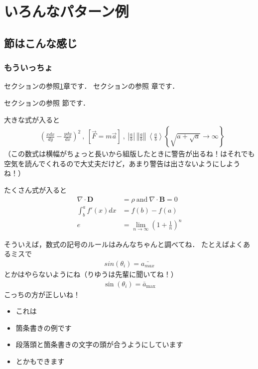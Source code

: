 \documentclass{jlreq}%
\numberwithin{equation}{section}%
\begin{document}
\section{いろんなパターン例}\label{sec:基本}
\subsection{節はこんな感じ}\label{sec:基本2}
\subsubsection{もういっちょ}

セクションの参照\ref{sec:基本}章です．
セクションの参照 章です．

セクションの参照 節です．

大きな式が入ると
\begin{align}
     & \left(\frac{xdx}{dy} -\frac{ydy}{dx}\right)^{2} \ ,\ \left[\vec{F} =m\vec{a}\right] \ ,\ \left| \frac{a}{b}\right| \ \left\Vert \frac{a}{b}\right\Vert \ \left< \frac{a}{b}\right> \left\{\sqrt{a+\sqrt{a}}\rightarrow \infty \right\}
\end{align}%
（この数式は横幅がちょっと長いから組版したときに警告が出るね！\LaTeXe はそれでも空気を読んでくれるので大丈夫だけど，あまり警告は出さないようにしようね！）

たくさん式が入ると
\begin{align}
    \nabla \cdot \mathbf{D} & =\rho \ \mathrm{and} \ \nabla \cdot \mathbf{B} =0\                   \\
    \int ^{a}_{b} f'( x) dx & = f( b) -f( a)                                                       \\
    e                       & = \lim\limits _{n\rightarrow \infty }\left( 1+\frac{1}{n}\right)^{n}
\end{align}

そういえば，数式の記号のルールはみんなちゃんと調べてね．
たとえばよくあるミスで
\begin{align}
    sin(\theta_i) = \bar{a_{max}}
\end{align}
とかはやらないようにね（りゆうは先輩に聞いてね！）
\begin{align}
    \sin(\theta_i) = \bar{a}_{\textrm{max}}
\end{align}
こっちの方が正しいね！

\begin{itemize}
    \item これは
    \item 箇条書きの例です
    \item 段落頭と箇条書きの文字の頭が合うようにしています
    \item[壱.] とかもできます
\end{itemize}
\end{document}
